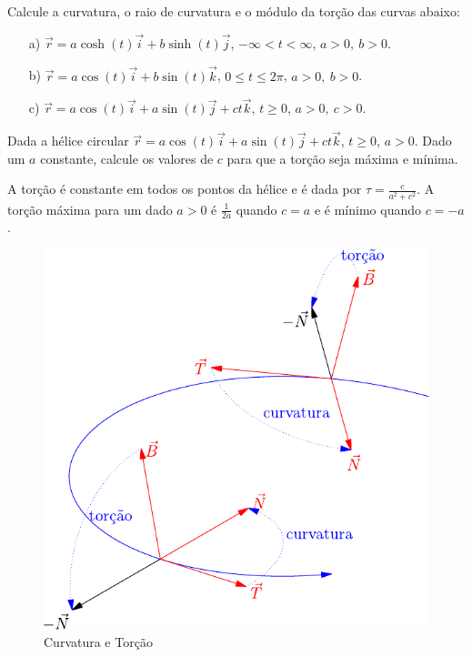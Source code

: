 \begin{exer} Calcule a curvatura, o raio de curvatura e o módulo da torção das curvas abaixo:
\begin{itemize}
\item[a)] $\vec{r}=a\cosh(t)\vec{i}+b\sinh(t)\vec{j}$, $-\infty<t<\infty$, $a>0,\ b>0$.
\item[b)] $\vec{r}=a\cos(t)\vec{i}+b\sin(t)\vec{k}$, $0\leq t\leq 2\pi$, $a>0,\ b>0$.
\item[c)] $\vec{r}=a\cos(t)\vec{i}+a\sin(t)\vec{j}+ct\vec{k}$, $t\geq 0$, $a>0,\ c>0$.

\end{itemize}
\end{exer}
 
 \begin{exer}{\label{prob_torcao}} Dada a hélice circular $\vec{r}=a\cos(t)\vec{i}+a\sin(t)\vec{j}+ct\vec{k}$, $t\geq 0$, $a>0$. Dado um $a$ constante, calcule os valores de $c$ para que a torção seja máxima e mínima.
 \end{exer}
\begin{resp}
  A torção é constante em todos os pontos da hélice e é dada por $\tau=\frac{c}{a^2+c^2}$. A torção máxima para um dado $a>0$ é $\frac{1}{2a}$ quando $c=a$ e é mínimo quando $c=-a$.
\end{resp}

 
 \begin{figure}
\begin{center}
    \includegraphics{./cap_curvas/figs/curvatura_torcao}
 \caption{Curvatura e Torção}\label{Curvatura_torcao_1}
  \end{center}
\end{figure}


